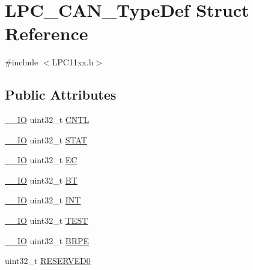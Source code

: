 \hypertarget{struct_l_p_c___c_a_n___type_def}{}\section{L\+P\+C\+\_\+\+C\+A\+N\+\_\+\+Type\+Def Struct Reference}
\label{struct_l_p_c___c_a_n___type_def}


{\ttfamily \#include $<$L\+P\+C11xx.\+h$>$}

\subsection*{Public Attributes}
\begin{DoxyCompactItemize}
\item 
\hyperlink{group___c_m_s_i_s__core__definitions_gaec43007d9998a0a0e01faede4133d6be}{\+\_\+\+\_\+\+IO} uint32\+\_\+t \hyperlink{group___l_p_c11xx___definitions_ga8add56ab65690f15125719eb9eda4470}{C\+N\+TL}
\item 
\hyperlink{group___c_m_s_i_s__core__definitions_gaec43007d9998a0a0e01faede4133d6be}{\+\_\+\+\_\+\+IO} uint32\+\_\+t \hyperlink{group___l_p_c11xx___definitions_ga0b209f4b82c9f56bbd7b3bbd74ea0c71}{S\+T\+AT}
\item 
\hyperlink{group___c_m_s_i_s__core__definitions_gaec43007d9998a0a0e01faede4133d6be}{\+\_\+\+\_\+\+IO} uint32\+\_\+t \hyperlink{group___l_p_c11xx___definitions_ga2c69811a8a235e77f2066a96610b9f96}{EC}
\item 
\hyperlink{group___c_m_s_i_s__core__definitions_gaec43007d9998a0a0e01faede4133d6be}{\+\_\+\+\_\+\+IO} uint32\+\_\+t \hyperlink{group___l_p_c11xx___definitions_ga5c23c4ebe014434dacbc966d68846f21}{BT}
\item 
\hyperlink{group___c_m_s_i_s__core__definitions_gaec43007d9998a0a0e01faede4133d6be}{\+\_\+\+\_\+\+IO} uint32\+\_\+t \hyperlink{group___l_p_c11xx___definitions_ga3019df722c0ccf0e0f0a3480c985d188}{I\+NT}
\item 
\hyperlink{group___c_m_s_i_s__core__definitions_gaec43007d9998a0a0e01faede4133d6be}{\+\_\+\+\_\+\+IO} uint32\+\_\+t \hyperlink{group___l_p_c11xx___definitions_gac41d8021c6279949be65ac66cb5d35d2}{T\+E\+ST}
\item 
\hyperlink{group___c_m_s_i_s__core__definitions_gaec43007d9998a0a0e01faede4133d6be}{\+\_\+\+\_\+\+IO} uint32\+\_\+t \hyperlink{group___l_p_c11xx___definitions_ga3b7c082aa752b35a5167f664ba74aafc}{B\+R\+PE}
\item 
uint32\+\_\+t \hyperlink{group___l_p_c11xx___definitions_ga97aaf019e54287718e9867461d05fccb}{R\+E\+S\+E\+R\+V\+E\+D0}

\end{DoxyCompactItemize}
